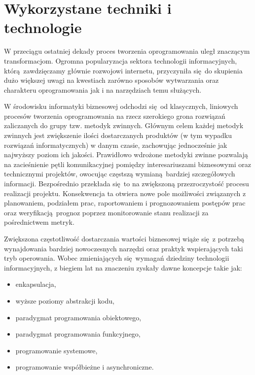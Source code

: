 \section{Wykorzystane techniki i technologie}\label{ss_internals-technologies}
W przeciągu ostatniej dekady proces tworzenia oprogramowania uległ znaczącym
transformacjom.
Ogromna popularyzacja sektora technologii informacyjnych, którą zawdzięczamy głównie rozwojowi internetu, przyczyniła się do skupienia dużo większej uwagi na kwestiach zarówno sposobów wytwarzania oraz charakteru oprogramowania jak i na narzędziach temu służących.

W środowisku informatyki biznesowej odchodzi się od klasycznych, liniowych procesów tworzenia oprogramowania na rzecz szerokiego grona rozwiązań zaliczanych do grupy tzw. metodyk zwinnych. 
Głównym celem każdej metodyk zwinnych jest zwiększenie ilości dostarczanych produktów (w tym wypadku rozwiązań informatycznych) w danym czasie, zachowując jednocześnie jak najwyższy poziom ich jakości.
Prawidłowo wdrożone metodyki zwinne pozwalają na zacieśnienie pętli komunikacyjnej pomiędzy interesariuszami biznesowymi oraz technicznymi projektów, owocując częstszą wymianą bardziej szczegółowych informacji.
Bezpośrednio przekłada się to na zwiększoną przezroczystość procesu realizacji projektu.
Konsekwencja ta otwiera nowe pole możliwości związanych z planowaniem, podziałem prac, raportowaniem i prognozowaniem postępów prac oraz weryfikacją prognoz poprzez monitorowanie stanu realizacji za pośrednictwem metryk.

\par{
Zwiększona częstotliwość dostarczania wartości biznesowej wiąże się z potrzebą wynajdowania bardziej nowoczesnych narzędzi oraz praktyk wspierających taki tryb operowania.
Wobec zmieniających się wymagań dziedziny technologii informacyjnych, z biegiem lat na znaczeniu zyskały dawne koncepcje takie jak:

\begin{itemize}
  \item enkapsulacja,
  \item wyższe poziomy abstrakcji kodu,
  \item paradygmat programowania obiektowego,
  \item paradygmat programowania funkcyjnego,
  \item programowanie systemowe,
  \item programowanie współbieżne i asynchroniczne.
\end{itemize}
}

